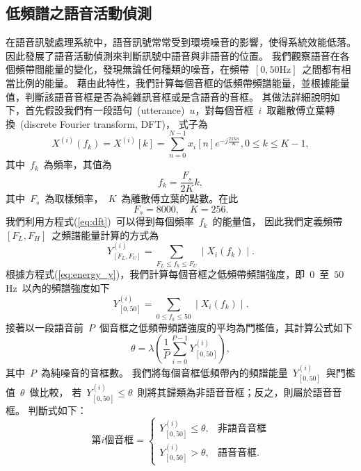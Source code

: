 \subsection{低頻譜之語音活動偵測}
\label{sec:vad}
在語音訊號處理系統中，語音訊號常常受到環境噪音的影響，使得系統效能低落。
因此發展了語音活動偵測來判斷訊號中語音與非語音的位置。
我們觀察語音在各個頻帶間能量的變化，發現無論任何種類的噪音，在頻帶~$\left[ 0,50 \text{Hz} \right]$~之間都有相當比例的能量。
藉由此特性，我們計算每個音框的低頻帶頻譜能量，並根據能量值，判斷該語音音框是否為純雜訊音框或是含語音的音框。
其做法詳細說明如下，首先假設我們有一段語句~(utterance)~$u$，對每個音框~$i$~取離散傅立葉轉換~(discrete Fourier transform, DFT)，
式子為
\begin{equation}
\label{eq:dft}
	X^{(i)}(f_k) = X^{(i)}[k] = \sum_{n=0}^{N-1}x_i[n]e^{-j \frac{2 \pi kn}{K} }, 0 \leq k \leq K-1,
\end{equation}
其中~$f_k$~為頻率，其值為
\begin{equation}
	f_k = \frac{F_s}{2K}k,
\end{equation}	
其中~$F_s$~為取樣頻率，~$K$~為離散傅立葉的點數。在此
\[
	F_s = 8000, \quad K = 256.
\]
我們利用方程式(\ref{eq:dft})~可以得到每個頻率~$f_k$~的能量值，
因此我們定義頻帶~$\left[ F_L,F_H \right]$~之頻譜能量計算的方式為
\begin{equation}
\label{eq:energy_y}
	Y_{\left[ F_L,F_U \right]}^{(i)} = \sum_{F_L \leq f_k \leq F_U} \mid X_i \left( f_k \right) \mid.
\end{equation}
根據方程式(\ref{eq:energy_y})，我們計算每個音框之低頻帶頻譜強度，即~$0$~至~$50$Hz~以內的頻譜強度如下
\begin{equation}
	Y_{\left[ 0,50 \right]}^{(i)} = \sum_{ 0 \leq f_k \leq 50} \mid X_i \left( f_k \right) \mid.
\end{equation}
接著以一段語音前~$P$~個音框之低頻帶頻譜強度的平均為門檻值，其計算公式如下
\begin{equation}
	\label{eq:theta}
	\theta= \lambda \left( \frac{1}{P}\sum_{i=0}^{P-1} Y_{\left[ 0,50 \right]}^{(i)} \right),
\end{equation}
其中~$P$~為純噪音的音框數。
我們將每個音框低頻帶內的頻譜能量~$Y_{\left[ 0,50 \right]}^{(i)}$~與門檻值~$\theta$~做比較，
若~$Y_{\left[ 0,50 \right]}^{(i)} \leq \theta$~則將其歸類為非語音音框；反之，則屬於語音音框。
判斷式如下：
\begin{equation}
	\text{第$i$個音框} =  \begin{cases} Y_{\left[ 0,50 \right]}^{(i)} \leq \theta, &\text{非語音音框} \\   
					     Y_{\left[ 0,50 \right]}^{(i)} > \theta,&\text{語音音框}.
					\end{cases} 	
\end{equation}
